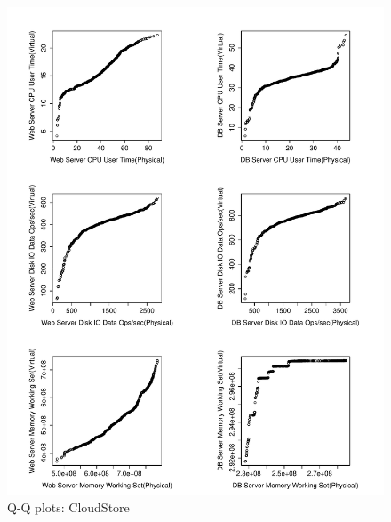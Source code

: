 \begin{figure}[thb]
	\centering
	\includegraphics[width=0.9\columnwidth]{figures/qqplots_CS.pdf}
	\caption{Q-Q plots: CloudStore}
	\label{fig:Results Table}
\end{figure}

\begin{table}[tbh]
	\centering
	\caption{Results of Mann-Whitney \textit{U} test and Cliff Delta on Performance Metrics}
	\label{my-label}
\end{table}

